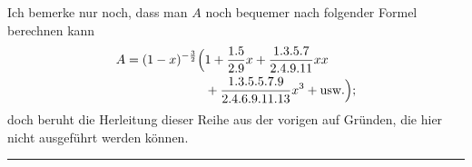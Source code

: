 Ich bemerke nur noch, dass man \(A\) noch bequemer nach folgender Formel berechnen kann
\[
\begin{aligned}
A=(1-x)^{-\frac32}\Bigl(&1+\frac{1.5}{2.9}x+\frac{1.3.5.7}{2.4.9.11}xx\\
&+\frac{1.3.5.5.7.9}{2.4.6.9.11.13}x^3+\text{usw.}\Bigr);
\end{aligned}
\]
doch beruht die Herleitung dieser Reihe aus der vorigen auf Gründen, die hier nicht ausgeführt werden können\HistoricalNoteEight{Vgl. Band III S. 209.]}.
\begin{center}\rule{.18\textwidth}{.35pt}\end{center}

